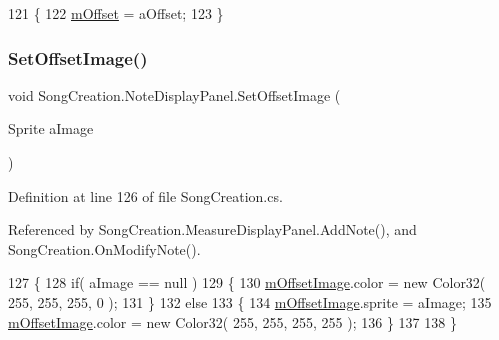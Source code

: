 \begin{DoxyCode}
121         \{
122             \hyperlink{class_song_creation_1_1_note_display_panel_ae1943fcafd54133bbc3e387cc49473b8}{mOffset} = aOffset;
123         \}
\end{DoxyCode}
\mbox{\label{class_song_creation_1_1_note_display_panel_a66f6128629d7ced83d0c1803dbfae813}} 
\subsubsection{\texorpdfstring{Set\+Offset\+Image()}{SetOffsetImage()}}
{\footnotesize\ttfamily void Song\+Creation.\+Note\+Display\+Panel.\+Set\+Offset\+Image (\begin{DoxyParamCaption}\item[{Sprite}]{a\+Image }\end{DoxyParamCaption})}



Definition at line 126 of file Song\+Creation.\+cs.



Referenced by Song\+Creation.\+Measure\+Display\+Panel.\+Add\+Note(), and Song\+Creation.\+On\+Modify\+Note().


\begin{DoxyCode}
127         \{
128             \textcolor{keywordflow}{if}( aImage == null )
129             \{
130                 \hyperlink{class_song_creation_1_1_note_display_panel_a9a63fa0205fec1d90c093ad4174aed00}{mOffsetImage}.color = \textcolor{keyword}{new} Color32( 255, 255, 255, 0 );
131             \}
132             \textcolor{keywordflow}{else}
133             \{
134                 \hyperlink{class_song_creation_1_1_note_display_panel_a9a63fa0205fec1d90c093ad4174aed00}{mOffsetImage}.sprite = aImage;
135                 \hyperlink{class_song_creation_1_1_note_display_panel_a9a63fa0205fec1d90c093ad4174aed00}{mOffsetImage}.color = \textcolor{keyword}{new} Color32( 255, 255, 255, 255 );
136             \}
137 
138         \}
\end{DoxyCode}
\mbox{\label{class_song_creation_1_1_note_display_panel_ad1c95108009b17e0fb0368fc35f362a8}} 
